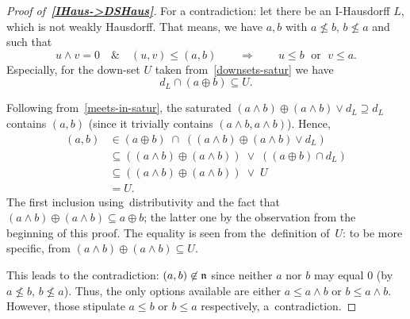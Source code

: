 \begin{proof}[Proof of~{\bf \ref{IHaus->DSHaus}}\thinspace]
  For a contradiction: let there be an I-Hausdorff $L$, which is not weakly
  Hausdorff.
  That means, we have $a, b$ with $a \not\leq b, \, b \not\leq a$ and such that
  \[
    u \wedge v = 0 \quad \& \quad \left(u, v\right) \leq \left(a, b\right)
    \qquad \Longrightarrow \qquad
    u \leq b \; \textrm{ or } \; v \leq a.
  \]
  Especially, for the down-set $U$ taken from~\ref{downsets-satur} we have
  \[
    d_L \cap (a \oplus b) \subseteq U.
  \]

  Following from~\ref{meets-in-satur}\thinspace, the saturated $\left(a \wedge
  b\right) \oplus \left(a \wedge b\right) \vee d_L \supseteq d_L$ contains $(a,
  b)$ (since it trivially contains $\left( a \wedge b, a \wedge b \right)$).
  Hence,
  \begin{align*}
    (a, b) &\in (a \oplus b) \; \cap \; ((a \wedge b) \oplus (a \wedge b) \vee d_L) \\
           &\subseteq ((a \wedge b) \oplus (a \wedge b)) \; \vee \; ((a \oplus b) \cap d_L) \\
           &\subseteq ((a \wedge b) \oplus (a \wedge b)) \; \vee \; U \\
           &= U.
  \end{align*}
  The first inclusion using~distributivity and the fact that $(a \wedge b)
  \oplus (a \wedge b) \subseteq a \oplus b$;
  the latter one by the observation from the beginning of this proof.
  The equality is seen from the~definition of~$U$:
  to be more specific, from $(a \wedge b) \oplus (a \wedge b) \subseteq U$.

  This leads to the contradiction:
  $(a, b)\not\in \mathfrak{n}$ since neither $a$ nor $b$ may equal $0$ (by $a \not\leq b,
  \, b \not\leq a$).
  Thus, the only options available are either $a \leq a \wedge b$ or $b \leq a
  \wedge b$.
  However, those stipulate $a \leq b$ or $b \leq a$ respectively,
  a~contradiction. 
\end{proof}
